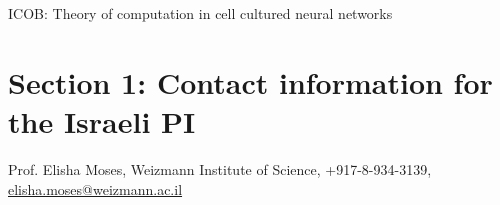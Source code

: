 \begin{center}
ICOB: Theory of computation in cell cultured neural networks
\end{center}
\section{Section 1: Contact information for the Israeli PI}
\noindent Prof. Elisha Moses, Weizmann Institute of Science, +917-8-934-3139, \href{mailto:elisha.moses@weizmann.ac.il}{elisha.moses@weizmann.ac.il}

